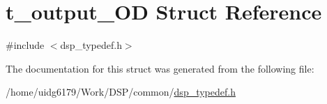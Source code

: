 \hypertarget{structt__output__OD}{}\section{t\+\_\+output\+\_\+\+OD Struct Reference}
\label{structt__output__OD}


{\ttfamily \#include $<$dsp\+\_\+typedef.\+h$>$}



The documentation for this struct was generated from the following file\+:\begin{DoxyCompactItemize}
\item 
/home/uidg6179/\+Work/\+D\+S\+P/common/\hyperlink{dsp__typedef_8h}{dsp\+\_\+typedef.\+h}\end{DoxyCompactItemize}
